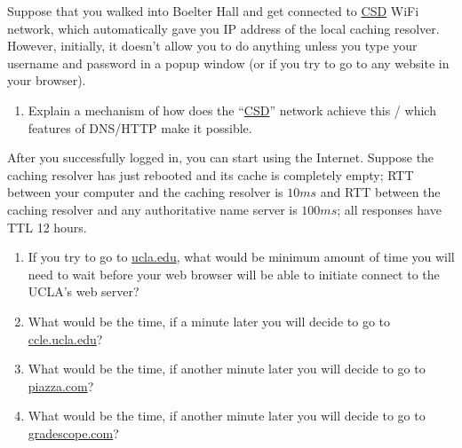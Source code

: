 \documentclass{report}
\begin{document}
\clearpage
\begin{problem}

Suppose that you walked into Boelter Hall and get connected to \url{CSD} WiFi network, which automatically gave you IP address of the local caching resolver.
However, initially, it doesn't allow you to do anything unless you type your username and password in a popup window (or if you try to go to any website in your browser).

\begin{enumerate}

\item Explain a mechanism of how does the ``\url{CSD}'' network achieve this / which features of DNS/HTTP make it possible.

\end{enumerate}

After you successfully logged in, you can start using the Internet.  Suppose the caching resolver has just rebooted and its cache is completely empty;  RTT between your computer and the caching resolver is $10 ms$ and RTT between the caching resolver and any authoritative name server is $100 ms$; all responses have TTL 12 hours.

\begin{enumerate}\addtocounter{enumi}{1}
\item If you try to go to \url{ucla.edu}, what would be minimum amount of time you will need to wait before your web browser will be able to initiate connect to the UCLA's web server?

\item What would be the time, if a minute later you will decide to go to \url{ccle.ucla.edu}?

\item What would be the time, if another minute later you will decide to go to \url{piazza.com}?

\item What would be the time, if another minute later you will decide to go to \url{gradescope.com}?

\end{enumerate}

\begin{answer}{30em}
\end{answer}


\end{problem}
\end{document}
